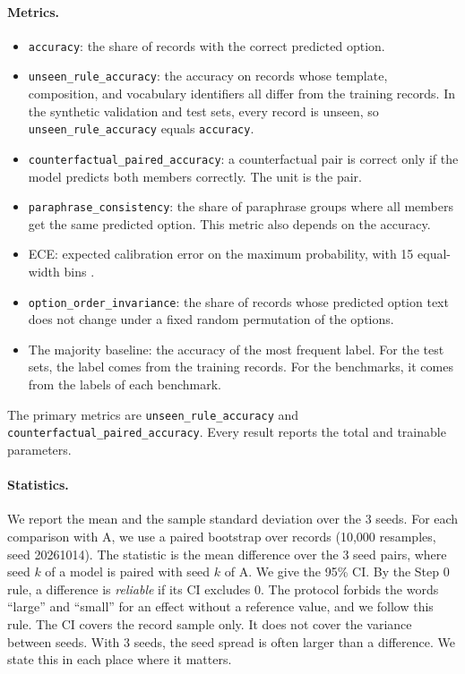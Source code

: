 \documentclass[11pt,a4paper]{article}
\newcommand{\ura}{\texttt{unseen\_\allowbreak rule\_\allowbreak accuracy}}
\newcommand{\cpa}{\texttt{counterfactual\_\allowbreak paired\_\allowbreak accuracy}}
\newcommand{\pcons}{\texttt{paraphrase\_\allowbreak consistency}}
\newcommand{\ooi}{\texttt{option\_\allowbreak order\_\allowbreak invariance}}
\begin{document}
\paragraph{Metrics.}
\begin{itemize}
  \item \texttt{accuracy}: the share of records with the correct predicted option.
  \item \ura{}: the accuracy on records whose template, composition, and vocabulary identifiers all differ from the training records. In the synthetic validation and test sets, every record is unseen, so \ura{} equals \texttt{accuracy}.
  \item \cpa{}: a counterfactual pair is correct only if the model predicts both members correctly. The unit is the pair.
  \item \pcons{}: the share of paraphrase groups where all members get the same predicted option. This metric also depends on the accuracy.
  \item ECE: expected calibration error on the maximum probability, with 15 equal-width bins \cite{guo2017}.
  \item \ooi{}: the share of records whose predicted option text does not change under a fixed random permutation of the options.
  \item The majority baseline: the accuracy of the most frequent label. For the test sets, the label comes from the training records. For the benchmarks, it comes from the labels of each benchmark.
\end{itemize}
The primary metrics are \ura{} and \cpa{}.
Every result reports the total and trainable parameters.

\paragraph{Statistics.}
We report the mean and the sample standard deviation over the 3 seeds.
For each comparison with A, we use a paired bootstrap over records (10{,}000 resamples, seed 20261014).
The statistic is the mean difference over the 3 seed pairs, where seed $k$ of a model is paired with seed $k$ of A.
We give the 95\% CI.
By the Step 0 rule, a difference is \emph{reliable} if its CI excludes 0.
The protocol forbids the words ``large'' and ``small'' for an effect without a reference value, and we follow this rule.
The CI covers the record sample only.
It does not cover the variance between seeds.
With 3 seeds, the seed spread is often larger than a difference.
We state this in each place where it matters.
\end{document}
